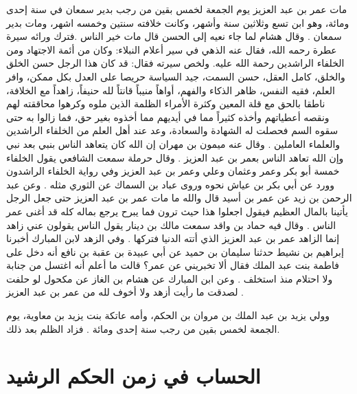 مات عمر بن عبد العزيز يوم الجمعة لخمس بقين من رجب بدير سمعان في سنة إحدى ومائة، وهو ابن تسع وثلاثين سنة وأشهر، وكانت خلافته سنتين وخمسه اشهر، ومات بدير سمعان \cite{ibnJareerTabari_Tareekh}. وقال هشام لما جاء نعيه إلى الحسن قال مات خير الناس \cite{dahabi_Siyar}.فترك ورائه سيرة عطرة رحمه الله، فقال عنه الذهي في سير أعلام النبلاء: وكان من أئمة الاجتهاد ومن الخلفاء الراشدين رحمة الله عليه. ولخص سيرته فقال: قد كان هذا الرجل حسن الخلق والخلق، كامل العقل، حسن السمت، جيد السياسة حريصا على العدل بكل ممكن، وافر العلم، فقيه النفس، ظاهر الذكاء والفهم، أواهاً منيباً قانتاً لله حنيفاً، زاهداً مع الخلافة، ناطقا بالحق مع قلة المعين وكثرة الأمراء الظلمة الذين ملوه وكرهوا محاققته لهم ونقصه أعطياتهم وأخذه كثيراً مما في أيديهم مما أخذوه بغير حق، فما زالوا به حتى سقوه السم فحصلت له الشهادة والسعادة، وعد عند أهل العلم من الخلفاء الراشدين والعلماء العاملين \cite{dahabi_Siyar}. وقال عنه ميمون بن مهران إن الله كان يتعاهد الناس بنبي بعد نبي وإن الله تعاهد الناس بعمر بن عبد العزيز \cite{dahabi_Siyar}. وقال حرملة سمعت الشافعي يقول الخلفاء خمسة أبو بكر وعمر وعثمان وعلي وعمر بن عبد العزيز وفي رواية الخلفاء الراشدون وورد عن أبي بكر بن عياش نحوه وروى عباد بن السماك عن الثوري مثله \cite{dahabi_Siyar}. وعن عبد الرحمن بن زيد عن عمر بن أسيد قال والله ما مات عمر بن عبد العزيز حتى جعل الرجل يأتينا بالمال العظيم فيقول اجعلوا هذا حيث ترون فما يبرح يرجع بماله كله قد أغنى عمر الناس \cite{dahabi_Siyar}. وقال فيه حماد بن واقد سمعت مالك بن دينار يقول الناس يقولون عني زاهد إنما الزاهد عمر بن عبد العزيز الذي أتته الدنيا فتركها \cite{dahabi_Siyar}. وفي الزهد لابن المبارك أخبرنا إبراهيم بن نشيط حدثنا سليمان بن حميد عن أبي عبيدة بن عقبة بن نافع أنه دخل على فاطمة بنت عبد الملك فقال ألا تخبريني عن عمر؟ قالت ما أعلم أنه اغتسل من جنابة ولا احتلام منذ استخلف \cite{dahabi_Siyar}. وعن ابن المبارك عن هشام بن الغاز عن مكحول لو حلفت لصدقت ما رأيت أزهد ولا أخوف لله من عمر بن عبد العزيز \cite{dahabi_Siyar}.

وولي يزيد بن عبد الملك بن مروان بن الحكم، وأمه عاتكة بنت يزيد بن معاوية، يوم الجمعة لخمس بقين من رجب سنة إحدى ومائة \cite{ibnAbdRabbih_AlIqd}. فزاد الظلم بعد ذلك. 

\section{الحساب في زمن الحكم الرشيد}


